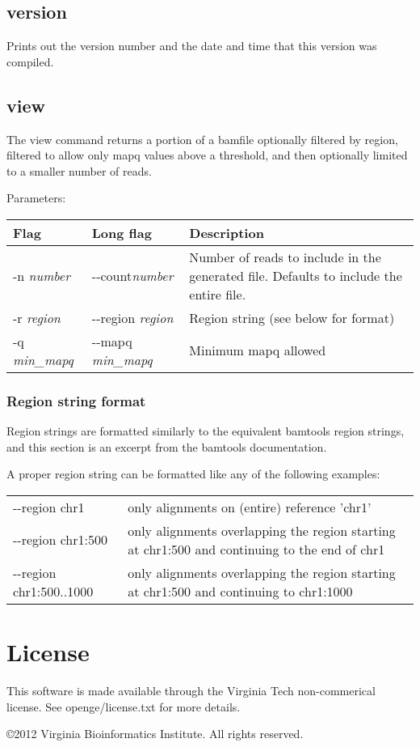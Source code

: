 \documentclass[11pt]{article}
\begin{document}
\subsection{version}
Prints out the version number and the date and time that this version was compiled.

\subsection{view}
The view command returns a portion of a bamfile optionally filtered by region, filtered to allow only mapq values above a threshold, and then optionally limited to a smaller number of reads.

Parameters:
\begin{center}
\begin{tabular}{llp{3.5in}}
\hline
Flag&Long flag&Description\\ \hline
-n \textit{number}&{-}{-}count\textit{number}&Number of reads to include in the generated file. Defaults to include the entire file.\\
-r \textit{region}&{-}{-}region \textit{region}&Region string (see below for format)\\
-q \textit{min\_mapq}&{-}{-}mapq \textit{min\_mapq}&Minimum mapq allowed\\
\end{tabular}
\end{center}

\subsubsection{Region string format}
Region strings are formatted similarly to the equivalent bamtools region strings, and this section is an excerpt from the bamtools documentation.

A proper region string can be formatted like any of the following examples:

\begin{center}
\begin{tabular}{lp{3.5in}}
{-}{-}region chr1&only alignments on (entire) reference 'chr1'\\
{-}{-}region chr1:500&only alignments overlapping the region starting at chr1:500 and continuing to the end of chr1\\
{-}{-}region chr1:500..1000&only alignments overlapping the region starting at chr1:500 and continuing to chr1:1000\\
\end{tabular}
\end{center}

\newpage
\section {License}
This software is made available through the Virginia Tech non-commerical license. See openge/license.txt for more details. 

\copyright 2012 Virginia Bioinformatics Institute. All rights reserved.
\end{document}
